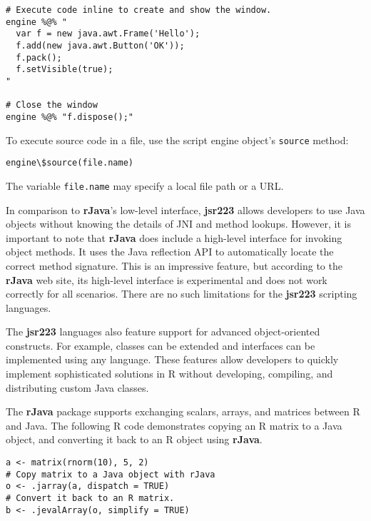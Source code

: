 \begin{verbatim}
# Execute code inline to create and show the window.
engine %@% "
  var f = new java.awt.Frame('Hello');
  f.add(new java.awt.Button('OK'));
  f.pack();
  f.setVisible(true);
"

# Close the window
engine %@% "f.dispose();"
\end{verbatim}
To execute source code in a file, use the script engine object's \texttt{source} method:
\begin{verbatim}
engine\$source(file.name)
\end{verbatim}
The variable \texttt{file.name} may specify a local file path or a URL. %

In comparison to \textbf{rJava}'s low-level interface, \textbf{jsr223} allows developers to use Java objects without knowing the details of JNI and method lookups. However, it is important to note that \textbf{rJava} does include a high-level interface for invoking object methods. It uses the Java reflection API to automatically locate the correct method signature. This is an impressive feature, but according to the \textbf{rJava} web site, its high-level interface is experimental and does not work correctly for all scenarios. There are no such limitations for the \textbf{jsr223} scripting languages.

The \textbf{jsr223} languages also feature support for advanced object-oriented constructs. For example, classes can be extended and interfaces can be implemented using any language. These features allow developers to quickly implement sophisticated solutions in R without developing, compiling, and distributing custom Java classes.

The \textbf{rJava} package supports exchanging scalars, arrays, and matrices between R and Java. The following R code demonstrates copying an R matrix to a Java object, and converting it back to an R object using \textbf{rJava}.

\clearpage

\begin{verbatim}
a <- matrix(rnorm(10), 5, 2)
# Copy matrix to a Java object with rJava
o <- .jarray(a, dispatch = TRUE)
# Convert it back to an R matrix.
b <- .jevalArray(o, simplify = TRUE)
\end{verbatim}

